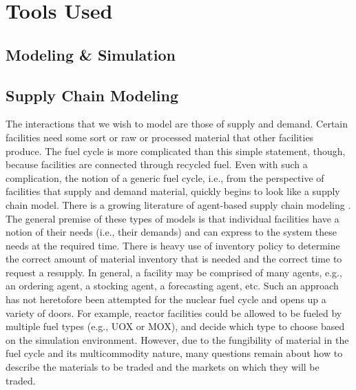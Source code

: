 
\section{Tools Used}

\subsection{Modeling \& Simulation}\label{intro:sim}

\subsection{Supply Chain Modeling}
The interactions that we wish to model are those of supply and demand. Certain
facilities need some sort or raw or processed material that other facilities
produce. The fuel cycle is more complicated than this simple statement, though,
because facilities are connected through recycled fuel. Even with such a
complication, the notion of a generic fuel cycle, i.e., from the perspective of
facilities that supply and demand material, quickly begins to look like a supply
chain model. There is a growing literature of agent-based supply chain modeling
\cite{swaminathan_modeling_1998,julka_agent-based_2002,van_der_zee_modeling_2005,chatfield_multi-formalism_2007,holmgren_agent_2007}.
The general premise of these types of models is that individual facilities have
a notion of their needs (i.e., their demands) and can express to the system
these needs at the required time. There is heavy use of inventory policy to
determine the correct amount of material inventory that is needed and the
correct time to request a resupply. In general, a facility may be comprised of
many agents, e.g., an ordering agent, a stocking agent, a forecasting agent,
etc. Such an approach has not heretofore been attempted for the nuclear fuel
cycle and opens up a variety of doors. For example, reactor facilities could be
allowed to be fueled by multiple fuel types (e.g., UOX or MOX), and decide which
type to choose based on the simulation environment. However, due to the
fungibility of material in the fuel cycle and its multicommodity nature, many
questions remain about how to describe the materials to be traded and the
markets on which they will be traded. 

